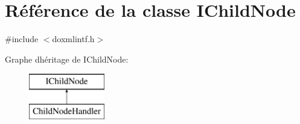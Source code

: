 \hypertarget{class_i_child_node}{}\section{Référence de la classe I\+Child\+Node}
\label{class_i_child_node}


{\ttfamily \#include $<$doxmlintf.\+h$>$}

Graphe d\textquotesingle{}héritage de I\+Child\+Node\+:\begin{figure}[H]
\begin{center}
\leavevmode
\includegraphics[height=2.000000cm]{class_i_child_node}
\end{center}
\end{figure}
